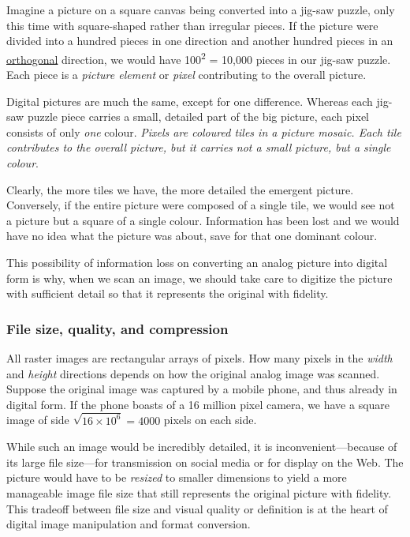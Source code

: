 \documentclass[
  11pt,
  british,
  a4paper,
]{article}
\begin{document}
Imagine a picture on a square canvas being converted into a jig-saw
puzzle, only this time with square-shaped rather than irregular pieces.
If the picture were divided into a hundred pieces in one direction and
another hundred pieces in an
\href{https://en.wikipedia.org/wiki/Orthogonality}{orthogonal}
direction, we would have 100\textsuperscript{2} = 10,000 pieces in our
jig-saw puzzle. Each piece is a \emph{picture element} or \emph{pixel}
contributing to the overall picture.

Digital pictures are much the same, except for one difference. Whereas
each jig-saw puzzle piece carries a small, detailed part of the big
picture, each pixel consists of only \emph{one} colour. \emph{Pixels are
coloured tiles in a picture mosaic. Each tile contributes to the overall
picture, but it carries not a small picture, but a single colour}.

Clearly, the more tiles we have, the more detailed the emergent picture.
Conversely, if the entire picture were composed of a single tile, we
would see not a picture but a square of a single colour. Information has
been lost and we would have no idea what the picture was about, save for
that one dominant colour.

This possibility of information loss on converting an analog picture
into digital form is why, when we scan an image, we should take care to
digitize the picture with sufficient detail so that it represents the
original with fidelity.

\hypertarget{file-size-quality-and-compression}{%
\subsubsection{File size, quality, and
compression}\label{file-size-quality-and-compression}}

All raster images are rectangular arrays of pixels. How many pixels in
the \emph{width} and \emph{height} directions depends on how the
original analog image was scanned. Suppose the original image was
captured by a mobile phone, and thus already in digital form. If the
phone boasts of a 16 million pixel camera, we have a square image of
side \(\sqrt{16\times 10^6} = 4000\) pixels on each side.

While such an image would be incredibly detailed, it is
inconvenient---because of its large file size---for transmission on
social media or for display on the Web. The picture would have to be
\emph{resized} to smaller dimensions to yield a more manageable image
file size that still represents the original picture with fidelity. This
tradeoff between file size and visual quality or definition is at the
heart of digital image manipulation and format conversion.
\end{document}
